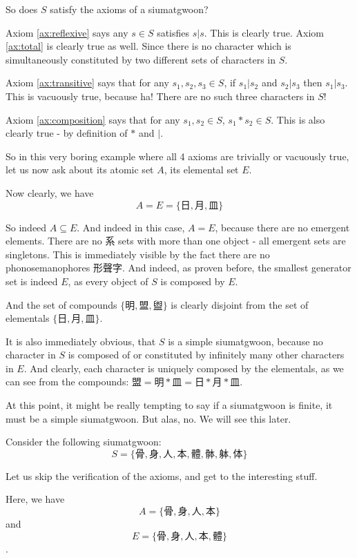 So does $S$ satisfy the axioms of a siumatgwoon? 

Axiom \ref{ax:reflexive} says any $s\in S$ satisfies $s|s$. This is clearly true. 
Axiom \ref{ax:total} is clearly true as well. Since there is no character which is simultaneously constituted by two different sets of characters in $S$.

Axiom \ref{ax:transitive} says that for any $s_1, s_2, s_3 \in S$, if $s_1|s_2$ and $s_2|s_3$ then $s_1|s_3$. This is vacuously true, because ha! There are no such three characters in $S$! 

Axiom \ref{ax:composition} says that for any $s_1, s_2 \in S$, $s_1*s_2 \in S$. This is also clearly true - by definition of $*$ and $|$.

So in this very boring example where all 4 axioms are trivially or vacuously true, let us now ask about its atomic set $A$, its elemental set $E$.

Now clearly, we have 
$$A=E=\{\text{日},\text{月},\text{皿}\}$$

So indeed $A\subseteq E$. And indeed in this case, $A=E$, because there are no emergent elements. There are no 系 sets with more than one object - all emergent sets are singletons. This is immediately visible by the fact there are no phonosemanophores 形聲字. And indeed, as proven before, the smallest generator set is indeed $E$, as every object of $S$ is composed by $E$.

And the set of compounds $\{\text{明},\text{盟},\text{盥}\}$ is clearly disjoint from the set of elementals $\{\text{日},\text{月},\text{皿}\}$. 

It is also immediately obvious, that $S$ is a simple siumatgwoon, because no character in $S$ is composed of or constituted by infinitely many other characters in $E$. And clearly, each character is uniquely composed by the elementals, as we can see from the compounds: $\text{盟} =\text{明}*\text{皿} = \text{日}*\text{月}*\text{皿}$.


At this point, it might be really tempting to say if a siumatgwoon is finite, it must be a simple siumatgwoon. But alas, no. We will see this later.


Consider the following siumatgwoon: 
$$S=\{\text{骨}, \text{身}, \text{人}, \text{本}, \text{體}, \text{骵}, \text{躰}, \text{体}\}$$

Let us skip the verification of the axioms, and get to the interesting stuff.

Here, we have 
$$A=\{\text{骨}, \text{身}, \text{人}, \text{本}\}$$
and 
$$E=\{\text{骨}, \text{身}, \text{人}, \text{本}, \text{體}\}$$.


